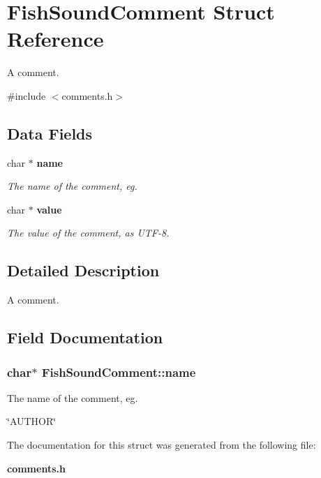 \section{Fish\-Sound\-Comment Struct Reference}
\label{structFishSoundComment}


A comment.  




{\ttfamily \#include $<$comments.\-h$>$}

\subsection*{Data Fields}
\begin{DoxyCompactItemize}
\item 
char $\ast$ {\bf name}
\begin{DoxyCompactList}\small\item\em The name of the comment, eg. \end{DoxyCompactList}\item 
char $\ast$ {\bf value}\label{structFishSoundComment_a4293f69fe0e695fc9102e1667ce9add1}

\begin{DoxyCompactList}\small\item\em The value of the comment, as U\-T\-F-\/8. \end{DoxyCompactList}\end{DoxyCompactItemize}


\subsection{Detailed Description}
A comment. 

\subsection{Field Documentation}
\subsubsection[{name}]{\setlength{\rightskip}{0pt plus 5cm}char$\ast$ Fish\-Sound\-Comment\-::name}\label{structFishSoundComment_aededfdcebf50dc81cce9d714e5cda6df}


The name of the comment, eg. 

\char`\"{}\-A\-U\-T\-H\-O\-R\char`\"{} 

The documentation for this struct was generated from the following file\-:\begin{DoxyCompactItemize}
\item 
{\bf comments.\-h}\end{DoxyCompactItemize}
